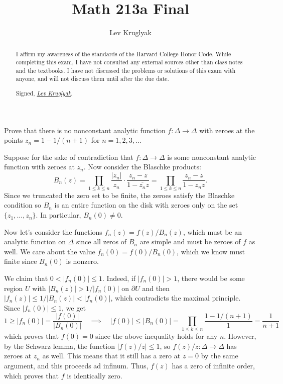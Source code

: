 \documentclass{pset}
\title{Math 213a Final}
\author{Lev Kruglyak}
\begin{document}
\maketitle

\begin{abstract}
I affirm my awareness of the standards of the Harvard College Honor Code. While completing this exam, I have not consulted any external sources other than class notes and the textbooks. I have not discussed the problems or solutions of this exam with anyone, and will not discuss them until after the due date.

\medskip
Signed, \underline{\textit{Lev Kruglyak}}.
\end{abstract}

\begin{problem}{3.16}
  Prove that there is no nonconstant analytic function $f : \Delta \to \Delta$ with zeroes at the points $z_n = 1-1/(n+1)$ for $n=1,2,3,\ldots$ %
\end{problem}

\begin{solution}
  Suppose for the sake of contradiction that $f : \Delta \to \Delta$ is some nonconstant analytic function with zeroes at $z_n$. Now consider the Blaschke products: 
  \[
    B_n(z) = \prod_{1\leq k\leq n} \frac{|z_n|}{z_n}\cdot \frac{z_n - z}{1-\overline{z_n} z} = \prod_{1\leq k \leq n} \frac{z_n - z}{1-z_n z}.
  \]
  Since we truncated the zero set to be finite, the zeroes satisfy the Blaschke condition so $B_n$ is an entire function on the disk with zeroes only on the set $\{z_1,\ldots, z_n\}$. In particular, $B_n(0)\neq 0$.

  Now let's consider the functions $f_n(z) = f(z)/B_n(z)$, which must be an analytic function on $\Delta$ since all zeros of $B_n$ are simple and must be zeroes of $f$ as well. We care about the value $f_n(0)= f(0)/B_n(0)$, which we know must finite since $B_n(0)$ is nonzero. 

  We claim that $0<|f_n(0)|\leq 1$. Indeed, if $|f_n(0)|>1$, there would be some region $U$ with $|B_n(z)|>1/|f_n(0)|$ on $\partial U$ and then $|f_n(z)|\leq 1/|B_n(z)| < |f_n(0)|$, which contradicts the maximal principle. Since $|f_n(0)|\leq 1$, we get
  \[
    1\geq |f_n(0)| = \frac{|f(0)|}{|B_n(0)|} \quad\implies\quad |f(0)| \leq |B_n(0)| = \prod_{1\leq k \leq n} \frac{1-1/(n+1)}{1} = \frac{1}{n+1}
  \]
  which proves that $f(0)=0$ since the above inequality holds for any $n$. However, by the Schwarz lemma, the function $|f(z)/z|\leq 1$, so $f(z)/z : \Delta \to \Delta$ has zeroes at $z_n$ as well. This means that it still has a zero at $z=0$ by the same argument, and this proceeds ad infinum. Thus, $f(z)$ has a zero of infinite order, which proves that $f$ is identically zero.
\end{solution}
\end{document}
